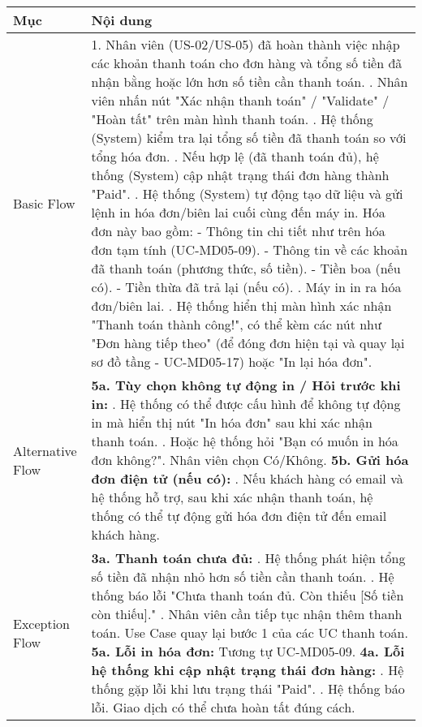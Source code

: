 \begin{longtable}{|m{4cm}|p{11cm}|}
\hline
\textbf{Mục} & \textbf{Nội dung} \\
\hline
Basic Flow & 1. Nhân viên (US-02/US-05) đã hoàn thành việc nhập các khoản thanh toán cho đơn hàng và tổng số tiền đã nhận bằng hoặc lớn hơn số tiền cần thanh toán. \newline 2. Nhân viên nhấn nút "Xác nhận thanh toán" / "Validate" / "Hoàn tất" trên màn hình thanh toán. \newline 3. Hệ thống (System) kiểm tra lại tổng số tiền đã thanh toán so với tổng hóa đơn. \newline 4. Nếu hợp lệ (đã thanh toán đủ), hệ thống (System) cập nhật trạng thái đơn hàng thành "Paid". \newline 5. Hệ thống (System) tự động tạo dữ liệu và gửi lệnh in hóa đơn/biên lai cuối cùng đến máy in. Hóa đơn này bao gồm: \newline    - Thông tin chi tiết như trên hóa đơn tạm tính (UC-MD05-09). \newline    - Thông tin về các khoản đã thanh toán (phương thức, số tiền). \newline    - Tiền boa (nếu có). \newline    - Tiền thừa đã trả lại (nếu có). \newline 6. Máy in in ra hóa đơn/biên lai. \newline 7. Hệ thống hiển thị màn hình xác nhận "Thanh toán thành công!", có thể kèm các nút như "Đơn hàng tiếp theo" (để đóng đơn hiện tại và quay lại sơ đồ tầng - UC-MD05-17) hoặc "In lại hóa đơn". \\
\hline
Alternative Flow & \textbf{5a. Tùy chọn không tự động in / Hỏi trước khi in:} \newline    1. Hệ thống có thể được cấu hình để không tự động in mà hiển thị nút "In hóa đơn" sau khi xác nhận thanh toán. \newline    2. Hoặc hệ thống hỏi "Bạn có muốn in hóa đơn không?". Nhân viên chọn Có/Không. \newline \textbf{5b. Gửi hóa đơn điện tử (nếu có):} \newline    1. Nếu khách hàng có email và hệ thống hỗ trợ, sau khi xác nhận thanh toán, hệ thống có thể tự động gửi hóa đơn điện tử đến email khách hàng. \\
\hline
Exception Flow & \textbf{3a. Thanh toán chưa đủ:} \newline    1. Hệ thống phát hiện tổng số tiền đã nhận nhỏ hơn số tiền cần thanh toán. \newline    2. Hệ thống báo lỗi "Chưa thanh toán đủ. Còn thiếu [Số tiền còn thiếu]." \newline    3. Nhân viên cần tiếp tục nhận thêm thanh toán. Use Case quay lại bước 1 của các UC thanh toán. \newline \textbf{5a. Lỗi in hóa đơn:} Tương tự UC-MD05-09. \newline \textbf{4a. Lỗi hệ thống khi cập nhật trạng thái đơn hàng:} \newline    1. Hệ thống gặp lỗi khi lưu trạng thái "Paid". \newline    2. Hệ thống báo lỗi. Giao dịch có thể chưa hoàn tất đúng cách. \\

\end{longtable}
